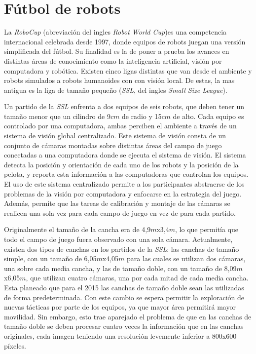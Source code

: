 
\section{Fútbol de robots}

La \emph{RoboCup} (abreviación del ingles \emph{Robot World Cup})es una
competencia internacional celebrada desde 1997, donde equipos de robots juegan
una versión simplificada del fútbol. Su finalidad es la de poner a prueba los
avances en distintas áreas de conocimiento como la inteligencia artificial,
visión por computadora y robótica. Existen cinco ligas distintas que van desde
el ambiente y robots simulados a robots humanoides con con visión local. De
estas, la mas antigua es la liga de tamaño pequeño (\emph{SSL}, del ingles
\emph{Small Size League}).

Un partido de la \emph{SSL} enfrenta a dos equipos de seis robots, que deben
tener un tamaño menor que un cilindro de 9$cm$ de radio y 15$cm$ de
alto\cite{sslrules2014}. Cada equipo es controlado por una computadora, ambas
perciben el ambiente a través de un sistema de visión global centralizado. Este
sistema de visión consta de un conjunto de cámaras montadas sobre distintas
áreas del campo de juego conectadas a una computadora donde se ejecuta el
sistema de visión. El sistema detecta la posición y orientación de cada uno de
los robots y la posición de la pelota, y reporta esta información a las
computadoras que controlan los equipos. El uso de este sistema centralizado
permite a los participantes abstraerse de los problemas de la visión por
computadora y enfocarse en la estrategia del juego. Además, permite que las
tareas de calibración y montaje de las cámaras se realicen una sola vez para
cada campo de juego en vez de para cada partido.


Originalmente el tamaño de la cancha era de 4,9$m$x3,4$m$, lo que permitía que
todo el campo de juego fuera observado con una sola cámara. Actualmente, existen
dos tipos de canchas en los partidos de la \emph{SSL}: las canchas de tamaño
simple, con un tamaño de 6,05$m$x4,05$m$ para las cuales se utilizan dos
cámaras, una sobre cada media cancha, y las de tamaño doble, con un tamaño de
8,09$m$x6,05$m$, que utilizan cuatro cámaras, una por cada mitad de cada media
cancha. Esta planeado que para el 2015 las canchas de tamaño doble sean las
utilizadas de forma predeterminada. Con este cambio se espera permitir la
exploración de nuevas tácticas por parte de los equipos, ya que mayor área
permitirá mayor movilidad. Sin embargo, esto trae aparejado el problema de que
en las canchas de tamaño doble se deben procesar cuatro veces la información que
en las canchas originales, cada imagen teniendo una resolución levemente
inferior a 800x600 píxeles.
